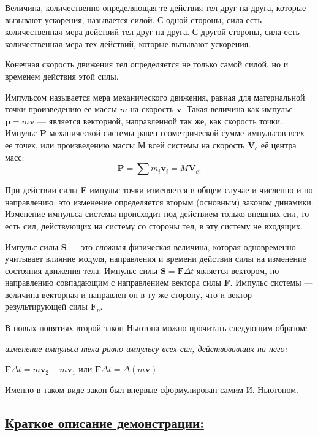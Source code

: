 \documentclass[14pt,a4paper,oneside]{extarticle}	%
\begin{document}
Величина, количественно определяющая те действия тел друг 
на друга, которые вызывают ускорения, называется силой. 
С одной стороны, сила есть количественная мера действий тел друг на друга.
С другой стороны, сила есть количественная мера тех действий, которые вызывают ускорения.  

Конечная скорость движения тел определяется не только самой 
силой, но и временем действия этой силы. 

Импульсом называется мера механического движения, равная для материальной точки произведению ее массы $ m $ на скорость $ \textbf{v} $.
Такая величина как импульс $ \textbf{p} = m\textbf{v} $ — является векторной, направленной так же, как скорость точки.
Импульс $ \textbf{P} $ механической системы равен геометрической сумме импульсов всех ее точек, или произведению массы $ М $ всей системы на скорость $ \textbf{V}_{c} $ её центра масс: $$ \textbf{P} = \sum m_{i} \textbf{v}_{i} =  M\textbf{V}_{c}. $$

При действии силы \textbf{F} импульс точки изменяется в общем случае и численно и по направлению; это изменение определяется вторым (основным) законом динамики.
Изменение импульса системы происходит под действием только внешних сил, то есть сил, действующих на систему со стороны тел, в эту систему не входящих.

Импульс силы \textbf{S} — это сложная физическая величина, которая 
одновременно учитывает влияние модуля, направления и времени 
действия силы на изменение состояния движения тела.
Импульс силы $\textbf{S} = \textbf{F}\Delta t $ является вектором, по направлению совпадающим с направлением вектора силы \textbf{F}. 
Импульс системы — величина векторная и направлен он в ту же сторону, что и вектор результирующей силы $ \textbf{F}_{p} $.

В новых понятиях второй закон Ньютона можно прочитать следующим образом: 
\begin{flushleft}
	\textit{изменение импульса тела равно импульсу всех сил, действовавших на него:}
\end{flushleft}

\begin{center}
		$\textbf{F}\Delta t = m\textbf{v}_{2} - m\textbf{v}_{1} $ или $\textbf{F}\Delta t = \Delta(m\textbf{v}). $
\end{center}

Именно в таком виде закон был впервые сформулирован самим И. Ньютоном.

\subsection*{\underline{Краткое описание демонстрации:}}
\end{document}
